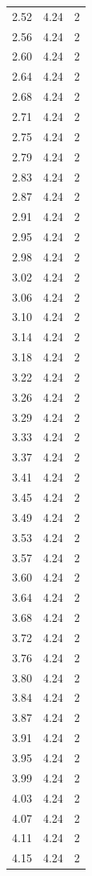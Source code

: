 \begin{longtable}{lrr}
  2.52 & 4.24 & 2 \\
  2.56 & 4.24 & 2 \\
  2.60 & 4.24 & 2 \\
  2.64 & 4.24 & 2 \\
  2.68 & 4.24 & 2 \\
  2.71 & 4.24 & 2 \\
  2.75 & 4.24 & 2 \\
  2.79 & 4.24 & 2 \\
  2.83 & 4.24 & 2 \\
  2.87 & 4.24 & 2 \\
  2.91 & 4.24 & 2 \\
  2.95 & 4.24 & 2 \\
  2.98 & 4.24 & 2 \\
  3.02 & 4.24 & 2 \\
  3.06 & 4.24 & 2 \\
  3.10 & 4.24 & 2 \\
  3.14 & 4.24 & 2 \\
  3.18 & 4.24 & 2 \\
  3.22 & 4.24 & 2 \\
  3.26 & 4.24 & 2 \\
  3.29 & 4.24 & 2 \\
  3.33 & 4.24 & 2 \\
  3.37 & 4.24 & 2 \\
  3.41 & 4.24 & 2 \\
  3.45 & 4.24 & 2 \\
  3.49 & 4.24 & 2 \\
  3.53 & 4.24 & 2 \\
  3.57 & 4.24 & 2 \\
  3.60 & 4.24 & 2 \\
  3.64 & 4.24 & 2 \\
  3.68 & 4.24 & 2 \\
  3.72 & 4.24 & 2 \\
  3.76 & 4.24 & 2 \\
  3.80 & 4.24 & 2 \\
  3.84 & 4.24 & 2 \\
  3.87 & 4.24 & 2 \\
  3.91 & 4.24 & 2 \\
  3.95 & 4.24 & 2 \\
  3.99 & 4.24 & 2 \\
  4.03 & 4.24 & 2 \\
  4.07 & 4.24 & 2 \\
  4.11 & 4.24 & 2 \\
  4.15 & 4.24 & 2 \\

\end{longtable}
